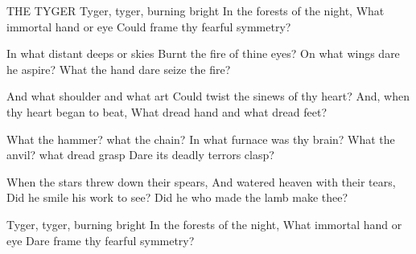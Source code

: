 THE TYGER
   Tyger, tyger, burning bright
   In the forests of the night,
   What immortal hand or eye
   Could frame thy fearful symmetry?

   In what distant deeps or skies
   Burnt the fire of thine eyes?
   On what wings dare he aspire?
   What the hand dare seize the fire?
   
   And what shoulder and what art
   Could twist the sinews of thy heart?
   And, when thy heart began to beat,
   What dread hand and what dread feet?
   
   What the hammer? what the chain?
   In what furnace was thy brain?
   What the anvil? what dread grasp
   Dare its deadly terrors clasp?
   
   When the stars threw down their spears,
   And watered heaven with their tears,
   Did he smile his work to see?
   Did he who made the lamb make thee?
   
   Tyger, tyger, burning bright
   In the forests of the night,
   What immortal hand or eye
   Dare frame thy fearful symmetry?